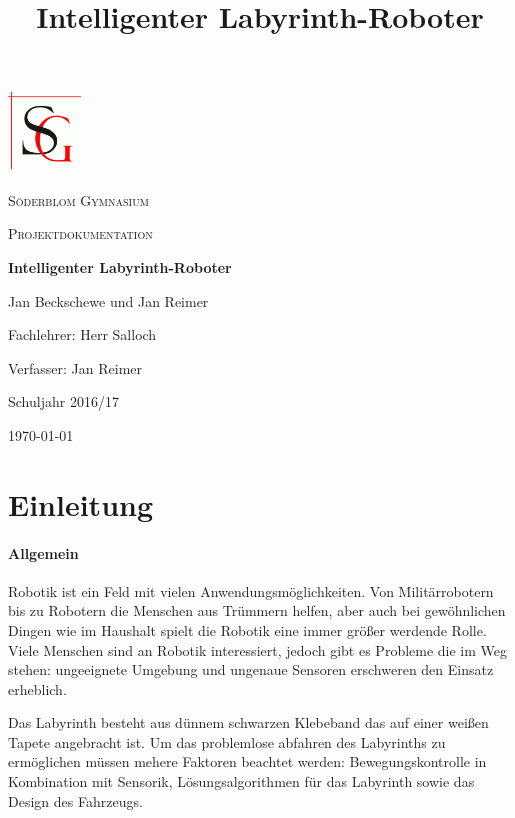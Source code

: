 \documentclass[12pt]{article}
\title{Intelligenter Labyrinth-Roboter}
\begin{document}
\begin{titlepage}
	\centering
	\includegraphics[width=0.15\textwidth]{sg-logo.png}\par\vspace{1cm}
	{\scshape\LARGE Söderblom Gymnasium \par}
	\vspace{1cm}
	{\scshape\Large Projektdokumentation\par}
	\vspace{1.5cm}
	{\huge\bfseries Intelligenter Labyrinth-Roboter\par}
	\vspace{1.5cm}
	{\Large Jan Beckschewe und Jan Reimer \par}
	\vspace{1.5cm}
	Fachlehrer: Herr Salloch \par
    \vspace{0.5cm}
    Verfasser: Jan Reimer \par
    \vspace{1cm}
	Schuljahr 2016/17 \par
    
	\vfill

	{\large \today\par}
\end{titlepage}
\restoregeometry
\tableofcontents
\thispagestyle{empty}
\newpage
\setcounter{page}{3}
\section{Einleitung}
\paragraph{Allgemein} Robotik ist ein Feld mit vielen Anwendungsmöglichkeiten. Von Militärrobotern bis zu Robotern die Menschen aus Trümmern helfen, aber auch bei gewöhnlichen Dingen wie im Haushalt spielt die Robotik eine immer größer werdende Rolle. Viele Menschen sind an Robotik interessiert, jedoch gibt es Probleme die im Weg stehen: ungeeignete Umgebung und ungenaue Sensoren erschweren den Einsatz erheblich.  

Das Labyrinth besteht aus dünnem schwarzen Klebeband das auf einer weißen Tapete angebracht ist. Um das problemlose abfahren des Labyrinths zu ermöglichen müssen mehere Faktoren beachtet werden: Bewegungskontrolle in Kombination mit Sensorik, Lösungsalgorithmen für das Labyrinth sowie das Design des Fahrzeugs.
\end{document}
